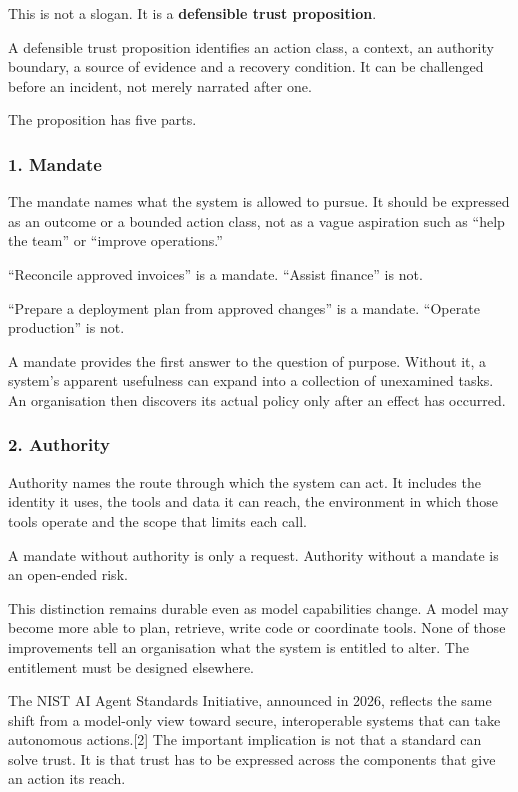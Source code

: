 This is not a slogan. It is a \textbf{defensible trust proposition}.

A defensible trust proposition identifies an action class, a context, an
authority boundary, a source of evidence and a recovery condition. It
can be challenged before an incident, not merely narrated after one.

The proposition has five parts.

\subsubsection{1. Mandate}\label{mandate}

The mandate names what the system is allowed to pursue. It should be
expressed as an outcome or a bounded action class, not as a vague
aspiration such as ``help the team'' or ``improve operations.''

``Reconcile approved invoices'' is a mandate. ``Assist finance'' is not.

``Prepare a deployment plan from approved changes'' is a mandate.
``Operate production'' is not.

A mandate provides the first answer to the question of purpose. Without
it, a system's apparent usefulness can expand into a collection of
unexamined tasks. An organisation then discovers its actual policy only
after an effect has occurred.

\subsubsection{2. Authority}\label{authority}

Authority names the route through which the system can act. It includes
the identity it uses, the tools and data it can reach, the environment
in which those tools operate and the scope that limits each call.

A mandate without authority is only a request. Authority without a
mandate is an open-ended risk.

This distinction remains durable even as model capabilities change. A
model may become more able to plan, retrieve, write code or coordinate
tools. None of those improvements tell an organisation what the system
is entitled to alter. The entitlement must be designed elsewhere.

The NIST AI Agent Standards Initiative, announced in 2026, reflects the
same shift from a model-only view toward secure, interoperable systems
that can take autonomous actions.{[}2{]} The important implication is
not that a standard can solve trust. It is that trust has to be
expressed across the components that give an action its reach.

